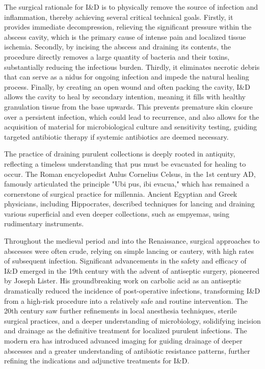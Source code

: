 The surgical rationale for I\&D is to physically remove the source of infection and inflammation, thereby achieving several critical technical goals. Firstly, it provides immediate decompression, relieving the significant pressure within the abscess cavity, which is the primary cause of intense pain and localized tissue ischemia. Secondly, by incising the abscess and draining its contents, the procedure directly removes a large quantity of bacteria and their toxins, substantially reducing the infectious burden. Thirdly, it eliminates necrotic debris that can serve as a nidus for ongoing infection and impede the natural healing process. Finally, by creating an open wound and often packing the cavity, I\&D allows the cavity to heal by secondary intention, meaning it fills with healthy granulation tissue from the base upwards. This prevents premature skin closure over a persistent infection, which could lead to recurrence, and also allows for the acquisition of material for microbiological culture and sensitivity testing, guiding targeted antibiotic therapy if systemic antibiotics are deemed necessary.

The practice of draining purulent collections is deeply rooted in antiquity, reflecting a timeless understanding that pus must be evacuated for healing to occur. The Roman encyclopedist Aulus Cornelius Celsus, in the 1st century AD, famously articulated the principle "Ubi pus, ibi evacua," which has remained a cornerstone of surgical practice for millennia. Ancient Egyptian and Greek physicians, including Hippocrates, described techniques for lancing and draining various superficial and even deeper collections, such as empyemas, using rudimentary instruments.

Throughout the medieval period and into the Renaissance, surgical approaches to abscesses were often crude, relying on simple lancing or cautery, with high rates of subsequent infection. Significant advancements in the safety and efficacy of I\&D emerged in the 19th century with the advent of antiseptic surgery, pioneered by Joseph Lister. His groundbreaking work on carbolic acid as an antiseptic dramatically reduced the incidence of post-operative infections, transforming I\&D from a high-risk procedure into a relatively safe and routine intervention. The 20th century saw further refinements in local anesthesia techniques, sterile surgical practices, and a deeper understanding of microbiology, solidifying incision and drainage as the definitive treatment for localized purulent infections. The modern era has introduced advanced imaging for guiding drainage of deeper abscesses and a greater understanding of antibiotic resistance patterns, further refining the indications and adjunctive treatments for I\&D.

